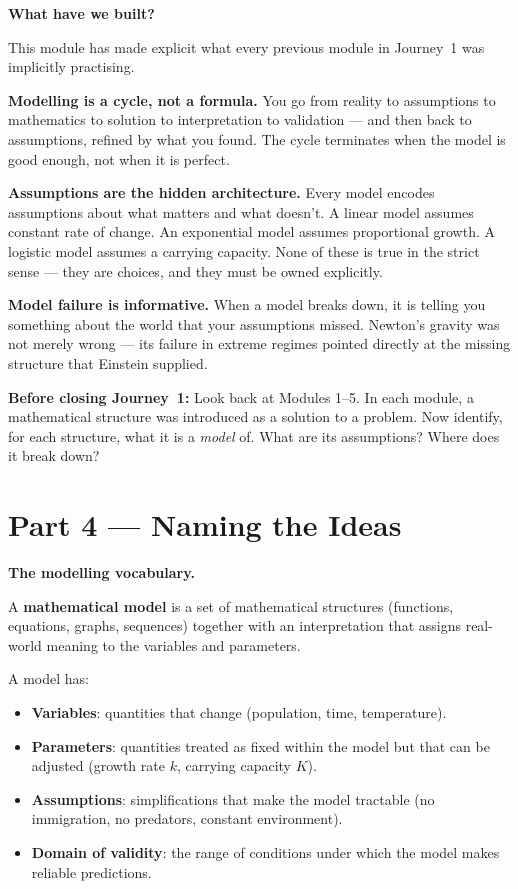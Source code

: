 \documentclass[12pt, a4paper]{article}
\newcounter{problem}
\begin{document}
\begin{discoverybox}
\textbf{What have we built?}

This module has made explicit what every previous module in Journey~1 was implicitly practising.

\medskip
\textbf{Modelling is a cycle, not a formula.} You go from reality to assumptions to mathematics to solution to interpretation to validation --- and then back to assumptions, refined by what you found. The cycle terminates when the model is good enough, not when it is perfect.

\medskip
\textbf{Assumptions are the hidden architecture.} Every model encodes assumptions about what matters and what doesn't. A linear model assumes constant rate of change. An exponential model assumes proportional growth. A logistic model assumes a carrying capacity. None of these is true in the strict sense --- they are choices, and they must be owned explicitly.

\medskip
\textbf{Model failure is informative.} When a model breaks down, it is telling you something about the world that your assumptions missed. Newton's gravity was not merely wrong --- its failure in extreme regimes pointed directly at the missing structure that Einstein supplied.

\medskip
\textbf{Before closing Journey~1:} Look back at Modules 1--5. In each module, a mathematical structure was introduced as a solution to a problem. Now identify, for each structure, what it is a \emph{model} of. What are its assumptions? Where does it break down?
\end{discoverybox}

\section{Part 4 \texorpdfstring{---}{--} Naming the Ideas}

\begin{namebox}
\textbf{The modelling vocabulary.}

A \textbf{mathematical model} is a set of mathematical structures (functions, equations, graphs, sequences) together with an interpretation that assigns real-world meaning to the variables and parameters.

\medskip
A model has:
\begin{itemize}[topsep=4pt, noitemsep]
  \item \textbf{Variables}: quantities that change (population, time, temperature).
  \item \textbf{Parameters}: quantities treated as fixed within the model but that can be adjusted (growth rate $k$, carrying capacity $K$).
  \item \textbf{Assumptions}: simplifications that make the model tractable (no immigration, no predators, constant environment).
  \item \textbf{Domain of validity}: the range of conditions under which the model makes reliable predictions.
\end{itemize}
\end{namebox}
\end{document}
